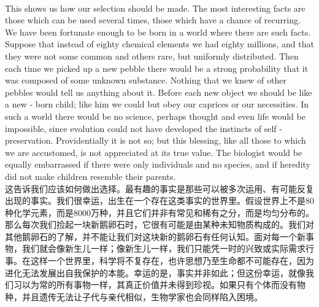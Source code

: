 \documentclass{article}
\begin{document}
\\
This shows us how our selection should be made. The most interesting facts are those which can be used several times, those which have a chance of recurring. We have been fortunate enough to be born in a world where there are such facts. Suppose that instead of eighty chemical elements we had eighty millions, and that they were not some common and others rare, but uniformly distributed. Then each time we picked up a new pebble there would be a strong probability that it was composed of some unknown substance. Nothing that we knew of other pebbles would tell us anything about it. Before each new object we should be like a new - born child; like him we could but obey our caprices or our necessities. In such a world there would be no science, perhaps thought and even life would be impossible, since evolution could not have developed the instincts of self - preservation. Providentially it is not so; but this blessing, like all those to which we are accustomed, is not appreciated at its true value. The biologist would be equally embarrassed if there were only individuals and no species, and if heredity did not make children resemble their parents.\\
这告诉我们应该如何做出选择。最有趣的事实是那些可以被多次运用、有可能反复出现的事实。我们很幸运，出生在一个存在这类事实的世界里。假设世界上不是80种化学元素，而是8000万种，并且它们并非有常见和稀有之分，而是均匀分布的。那么每次我们捡起一块新鹅卵石时，它很有可能是由某种未知物质构成的。我们对其他鹅卵石的了解，并不能让我们对这块新的鹅卵石有任何认知。面对每一个新事物，我们就会像新生儿一样；像新生儿一样，我们只能凭一时的兴致或实际需求行事。在这样一个世界里，科学将不复存在，也许思想乃至生命都不可能存在，因为进化无法发展出自我保护的本能。幸运的是，事实并非如此；但这份幸运，就像我们习以为常的所有事物一样，其真正价值并未得到珍视。如果只有个体而没有物种，并且遗传无法让子代与亲代相似，生物学家也会同样陷入困境。 \\
\end{document}
